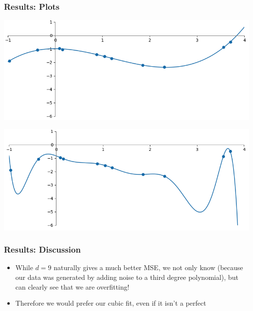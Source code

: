 \documentclass[10pt,aspectratio=169,handout]{beamer}
\begin{document}
\begin{frame}
    \frametitle{Results: Plots}

    \begin{minipage}{0.49\textwidth}
        \includegraphics[width=\textwidth]{images/task5-1-2_3.png}
    \end{minipage}
    \begin{minipage}{0.49\textwidth}
        \includegraphics[width=\textwidth]{images/task5-1-2_9.png}
    \end{minipage}

\end{frame}

\begin{frame}
    \frametitle{Results: Discussion}

    \begin{itemize}
        \item While $d=9$ naturally gives a much better MSE, we not only know (because our data was generated by adding noise to a third degree polynomial), but can clearly see that we are overfitting!
        \item Therefore we would prefer our cubic fit, even if it isn't a perfect
    \end{itemize}

\end{frame}
\end{document}
